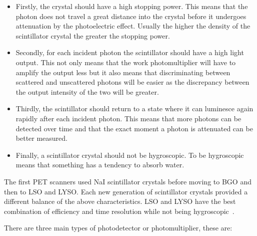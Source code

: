                 \begin{itemize}
                    \item Firstly, the crystal should have a high stopping power. This means that the photon does not travel a great distance into the crystal before it undergoes attenuation by the photoelectric effect. Usually the higher the density of the scintillator crystal the greater the stopping power.
                    
                    \item Secondly, for each incident photon the scintillator should have a high light output. This not only means that the work photomultiplier will have to amplify the output less but it also means that discriminating between scattered and unscattered photons will be easier as the discrepancy between the output intensity of the two will be greater.
                    
                    \item Thirdly, the scintillator should return to a state where it can luminesce again rapidly after each incident photon. This means that more photons can be detected over time and that the exact moment a photon is attenuated can be better measured.
                    
                    \item Finally, a scintillator crystal should not be hygroscopic. To be hygroscopic means that something has a tendency to absorb water.
                \end{itemize}
                
                The first \gls{PET} scanners used \gls{NaI} scintillator crystals before moving to \gls{BGO} and then to \gls{LSO} and \gls{LYSO}. Each new generation of scintillator crystals provided a different balance of the above characteristics. \gls{LSO} and \gls{LYSO} have the best combination of efficiency and time resolution while not being hygroscopic~.
                
                There are three main types of photodetector or photomultiplier, these are:
                
